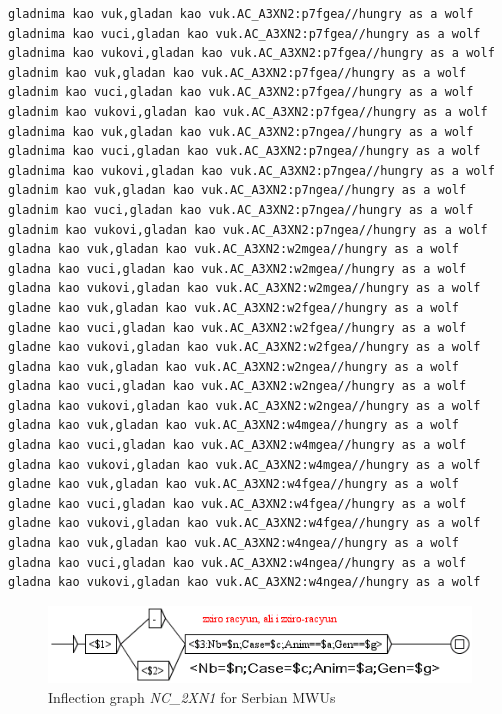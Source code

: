 \begin{verbatim}
gladnima kao vuk,gladan kao vuk.AC_A3XN2:p7fgea//hungry as a wolf
gladnima kao vuci,gladan kao vuk.AC_A3XN2:p7fgea//hungry as a wolf
gladnima kao vukovi,gladan kao vuk.AC_A3XN2:p7fgea//hungry as a wolf
gladnim kao vuk,gladan kao vuk.AC_A3XN2:p7fgea//hungry as a wolf
gladnim kao vuci,gladan kao vuk.AC_A3XN2:p7fgea//hungry as a wolf
gladnim kao vukovi,gladan kao vuk.AC_A3XN2:p7fgea//hungry as a wolf
gladnima kao vuk,gladan kao vuk.AC_A3XN2:p7ngea//hungry as a wolf
gladnima kao vuci,gladan kao vuk.AC_A3XN2:p7ngea//hungry as a wolf
gladnima kao vukovi,gladan kao vuk.AC_A3XN2:p7ngea//hungry as a wolf
gladnim kao vuk,gladan kao vuk.AC_A3XN2:p7ngea//hungry as a wolf
gladnim kao vuci,gladan kao vuk.AC_A3XN2:p7ngea//hungry as a wolf
gladnim kao vukovi,gladan kao vuk.AC_A3XN2:p7ngea//hungry as a wolf
gladna kao vuk,gladan kao vuk.AC_A3XN2:w2mgea//hungry as a wolf
gladna kao vuci,gladan kao vuk.AC_A3XN2:w2mgea//hungry as a wolf
gladna kao vukovi,gladan kao vuk.AC_A3XN2:w2mgea//hungry as a wolf
gladne kao vuk,gladan kao vuk.AC_A3XN2:w2fgea//hungry as a wolf
gladne kao vuci,gladan kao vuk.AC_A3XN2:w2fgea//hungry as a wolf
gladne kao vukovi,gladan kao vuk.AC_A3XN2:w2fgea//hungry as a wolf
gladna kao vuk,gladan kao vuk.AC_A3XN2:w2ngea//hungry as a wolf
gladna kao vuci,gladan kao vuk.AC_A3XN2:w2ngea//hungry as a wolf
gladna kao vukovi,gladan kao vuk.AC_A3XN2:w2ngea//hungry as a wolf
gladna kao vuk,gladan kao vuk.AC_A3XN2:w4mgea//hungry as a wolf
gladna kao vuci,gladan kao vuk.AC_A3XN2:w4mgea//hungry as a wolf
gladna kao vukovi,gladan kao vuk.AC_A3XN2:w4mgea//hungry as a wolf
gladne kao vuk,gladan kao vuk.AC_A3XN2:w4fgea//hungry as a wolf
gladne kao vuci,gladan kao vuk.AC_A3XN2:w4fgea//hungry as a wolf
gladne kao vukovi,gladan kao vuk.AC_A3XN2:w4fgea//hungry as a wolf
gladna kao vuk,gladan kao vuk.AC_A3XN2:w4ngea//hungry as a wolf
gladna kao vuci,gladan kao vuk.AC_A3XN2:w4ngea//hungry as a wolf
gladna kao vukovi,gladan kao vuk.AC_A3XN2:w4ngea//hungry as a wolf
\end{verbatim}
\normalsize

\begin{figure}[!htb]
  \centering
  \includegraphics[width=12.4cm]{resources/img/NC'2XN1'SRB.png}
  \caption{Inflection graph \emph{NC\_2XN1} for Serbian MWUs}
  \label{fig:NC'2XN1'SRB}
\end{figure}

